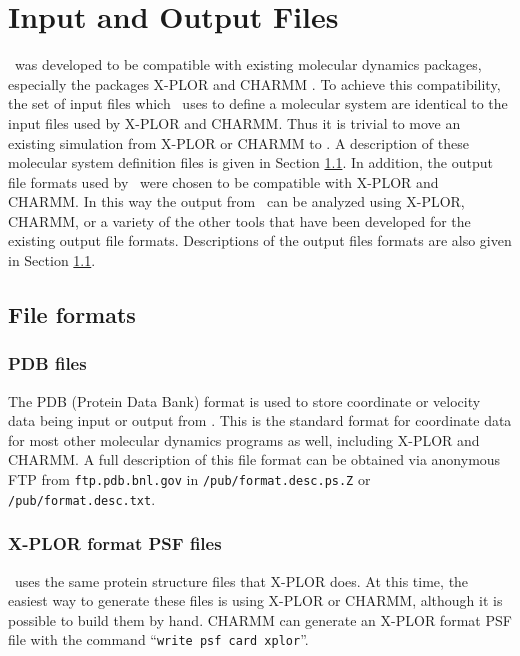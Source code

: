 
\section{Input and Output Files}
\label{section:files}

\NAMD\ was developed to be compatible with existing 
molecular dynamics packages, 
especially the packages X-PLOR 
and CHARMM .  
To achieve this compatibility,
the set of input files which \NAMD\ uses to define 
a molecular system are identical to the input files used by X-PLOR and CHARMM.  
Thus it is trivial to move an existing simulation from
X-PLOR or CHARMM to \NAMD.
A description of these molecular system definition 
files is given in Section \ref{section:formats}.  
\prettypar
In addition, the output file formats used by \NAMD\ 
were chosen to be compatible with X-PLOR and CHARMM.  
In this way the output from \NAMD\ can be analyzed using
X-PLOR, CHARMM, or a variety of the other tools that have 
been developed for the existing output file formats.  
Descriptions of the output files formats are also given in 
Section \ref{section:formats}.


\subsection{File formats}
\label{section:formats}

\subsubsection{PDB files}
The PDB (Protein Data Bank) format is used to store coordinate or velocity data 
being input or output from \NAMD.
This is the standard format for coordinate data
for most other molecular dynamics programs as well, including X-PLOR and CHARMM.
A full description of this file format can be obtained via anonymous FTP from
{\tt ftp.pdb.bnl.gov} in {\tt /pub/format.desc.ps.Z} or {\tt /pub/format.desc.txt}.

\subsubsection{X-PLOR format PSF files}

\NAMD\ uses the same protein structure files that X-PLOR does.
At this time, the
easiest way to generate these files is using X-PLOR or CHARMM,
although it is possible to build them by hand.
CHARMM can generate an X-PLOR format PSF file with the command
``{\tt write psf card xplor}''.

